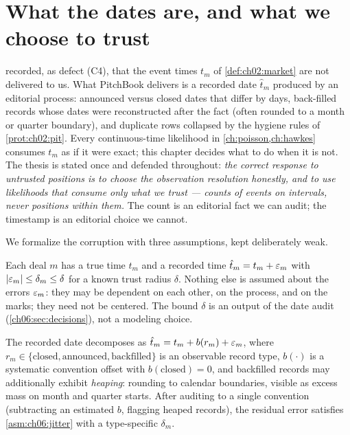 
\section{What the dates are, and what we choose to trust}\label{ch06:sec:defect}

 recorded, as defect (C4), that the event times $t_m$ of
\cref{def:ch02:market} are not delivered to us. What PitchBook delivers is a
recorded date $\hat t_m$ produced by an editorial process: announced versus
closed dates that differ by days, back-filled records whose dates were
reconstructed after the fact (often rounded to a month or quarter boundary),
and duplicate rows collapsed by the hygiene rules of
\cref{prot:ch02:pit}. Every continuous-time likelihood in
\cref{ch:poisson,ch:hawkes} consumes $t_m$ as if it were exact; this chapter
decides what to do when it is not. The thesis is stated once and defended
throughout: \emph{the correct response to untrusted positions is to choose
the observation resolution honestly, and to use likelihoods that consume
only what we trust --- counts of events on intervals, never positions within
them.} The count is an editorial fact we can audit; the timestamp is an
editorial choice we cannot.

We formalize the corruption with three assumptions, kept deliberately weak.

\begin{assumption}\label{asm:ch06:jitter}
Each deal $m$ has a true time $t_m$ and a recorded time
$\hat t_m = t_m + \varepsilon_m$ with $\left|\varepsilon_m\right| \le \delta_m \le \delta$ for a
known trust radius $\delta$. Nothing else is assumed about the errors
$\varepsilon_m$: they may be dependent on each other, on the process, and on the
marks; they need not be centered. The bound $\delta$ is an output of the
date audit (\cref{ch06:sec:decisions}), not a modeling choice.
\end{assumption}

\begin{assumption}\label{asm:ch06:convention}
The recorded date decomposes as
$\hat t_m = t_m + b(r_m) + \varepsilon_m$, where $r_m \in
\{\text{closed},\allowbreak \text{announced},\allowbreak
\text{backfilled}\}$ is an observable record type, $b(\cdot)$ is a
systematic convention offset with $b(\text{closed}) = 0$, and backfilled
records may additionally exhibit \emph{heaping}: rounding to calendar
boundaries, visible as excess mass on month and quarter starts. After
auditing to a single convention (subtracting an estimated $b$, flagging
heaped records), the residual error satisfies \cref{asm:ch06:jitter} with a
type-specific $\delta_m$.
\end{assumption}

